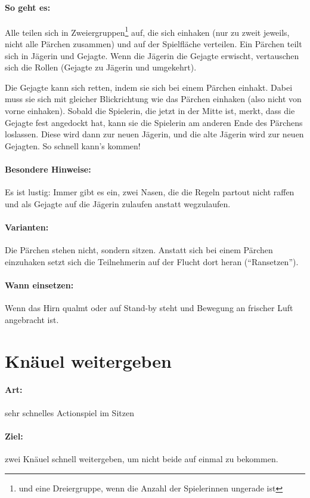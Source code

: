 \paragraph{So geht es:} Alle teilen sich in Zweiergruppen\footnote{und eine Dreiergruppe, wenn die Anzahl der Spielerinnen ungerade ist} auf, die sich einhaken (nur zu zweit jeweils, nicht alle Pärchen zusammen) und auf der Spielfläche verteilen. Ein Pärchen teilt sich in Jägerin und Gejagte. Wenn die Jägerin die Gejagte erwischt, vertauschen sich die Rollen (Gejagte zu Jägerin und umgekehrt).

Die Gejagte kann sich retten, indem sie sich bei einem Pärchen einhakt. Dabei muss sie sich mit gleicher Blickrichtung wie das Pärchen einhaken (also nicht von vorne einhaken). Sobald die Spielerin, die jetzt in der Mitte ist, merkt, dass die Gejagte fest angedockt hat, kann sie die Spielerin am anderen Ende des Pärchens loslassen. Diese wird dann zur neuen Jägerin, und die alte Jägerin wird zur neuen Gejagten. So schnell kann's kommen!
\paragraph{Besondere Hinweise:} Es ist lustig: Immer gibt es ein, zwei Nasen, die die Regeln partout nicht raffen und als Gejagte auf die Jägerin zulaufen anstatt wegzulaufen.
\paragraph{Varianten:} Die Pärchen stehen nicht, sondern sitzen. Anstatt sich bei einem Pärchen einzuhaken setzt sich die Teilnehmerin auf der Flucht dort heran ("`Ransetzen"').
\paragraph{Wann einsetzen:} Wenn das Hirn qualmt oder auf Stand-by steht und Bewegung an frischer Luft angebracht ist.

\section{Knäuel weitergeben}
\paragraph{Art:} sehr schnelles Actionspiel im Sitzen
\paragraph{Ziel:} zwei Knäuel schnell weitergeben, um nicht beide auf einmal zu bekommen.
